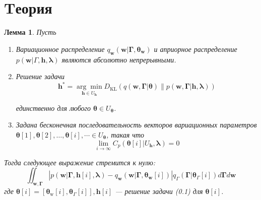 \documentclass[12pt]{article}
\newtheorem{lemma}[theorem]{Лемма}
\numberwithin{equation}{section}
\begin{document}
	\section*{Tеория}
	\begin{lemma}
		Пусть
		\begin{enumerate}
			\item Вариационное распределение $q_{\mathbf{w}}\left(\mathbf{w} | \mathbf{\Gamma}, \boldsymbol{\theta}_{\mathbf{w}}\right)$ и априорное распределение $p(\mathbf{w} | \Gamma, \mathbf{h}, \boldsymbol{\lambda})$ являются абсолютно непрерывными.
			\item Решение задачи
			\begin{equation}
						\mathbf{h}^{*}=\underset{\mathbf{h} \in U_{\mathbf{h}}}{\arg \min } D_{\mathrm{KL}}(q(\mathbf{w}, \mathbf{\Gamma} | \boldsymbol{\theta}) \| p(\mathbf{w}, \mathbf{\Gamma} | \mathbf{h}, \boldsymbol{\lambda}))
			\end{equation}

			единственно для любого $\boldsymbol{\theta} \in U_{\boldsymbol{\theta}}$.
			\item  Задана бесконечная последовательность векторов вариационных параметров $\boldsymbol{\theta}[1], \boldsymbol{\theta}[2], \ldots, \boldsymbol{\theta}[i], \cdots \in U_{\boldsymbol{\theta}}$, такая что $$\lim _{i \rightarrow \infty} C_{p}\left(\boldsymbol{\theta}[i] | U_{\mathbf{h}}, \boldsymbol{\lambda}\right)=0$$
		\end{enumerate}
	Тогда следующее выражение стремится к нулю:
	$$\iint_{\mathbf{w}, \mathbf{\Gamma}}\left|p(\mathbf{w} | \mathbf{\Gamma}, \mathbf{h}[i], \boldsymbol{\lambda})-q_{\mathbf{w}}\left(\mathbf{w} | \mathbf{\Gamma}, \boldsymbol{\theta}_{\mathbf{w}}[i]\right)\right| q_{\Gamma}\left(\mathbf{\Gamma} | \boldsymbol{\theta}_{\Gamma}[i]\right) d \mathbf{\Gamma} d \mathbf{w}$$
	где $\boldsymbol{\theta}[i]=\left[\boldsymbol{\theta}_{\mathrm{w}}[i], \boldsymbol{\theta}_{\Gamma}[i]\right], \mathbf{h}[i]$ --- решение задачи (0.1) для $\boldsymbol{\theta}[i]$.
	\end{lemma}
	
\end{document}
